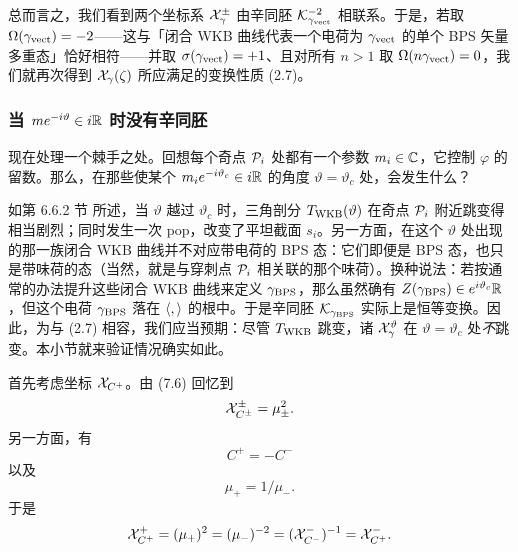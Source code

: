 总而言之，我们看到两个坐标系 $\mathcal{X}^\pm_\gamma$ 由辛同胚 $\mathcal{K}^{-2}_{\gamma_{\rm vect}}$ 相联系。于是，若取 $\Omega(\gamma_{\rm vect})=-2$——这与「闭合 WKB 曲线代表一个电荷为 $\gamma_{\rm vect}$ 的单个 BPS 矢量多重态」恰好相符——并取 $\sigma(\gamma_{\rm vect})=+1$、且对所有 $n>1$ 取 $\Omega(n\gamma_{\rm vect})=0$，我们就再次得到 $\mathcal{X}_\gamma(\zeta)$ 所应满足的变换性质 (2.7)。%

\subsubsection{当 $m e^{-i \vartheta} \in i \mathbb{R}$ 时没有辛同胚} \label{sec:no-flavor-jump}

现在处理一个棘手之处。回想每个奇点 $\mathcal{P}_i$ 处都有一个参数 $m_i\in\mathbb{C}$，它控制 $\varphi$ 的留数。那么，在那些使某个 $m_i e^{-i\vartheta_c}\in i\mathbb{R}$ 的角度 $\vartheta=\vartheta_c$ 处，会发生什么？

如第 6.6.2 节%
所述，当 $\vartheta$ 越过 $\vartheta_c$ 时，三角剖分 $T_{\rm WKB}(\vartheta)$ 在奇点 $\mathcal{P}_i$ 附近跳变得相当剧烈；同时发生一次 pop，改变了平坦截面 $s_i$。另一方面，在这个 $\vartheta$ 处出现的那一族闭合 WKB 曲线并不对应带电荷的 BPS 态：它们即便是 BPS 态，也只是带味荷的态（当然，就是与穿刺点 $\mathcal{P}_i$ 相关联的那个味荷）。换种说法：若按通常的办法提升这些闭合 WKB 曲线来定义 $\gamma_{\rm BPS}$，那么虽然确有 $Z(\gamma_{\rm BPS})\in e^{i\vartheta_c}\mathbb{R}$，但这个电荷 $\gamma_{\rm BPS}$ 落在 $\langle , \rangle$ 的根中。于是辛同胚 $\mathcal{K}_{\gamma_{\rm BPS}}$ 实际上是恒等变换。因此，为与 (2.7)%
相容，我们应当预期：尽管 $T_{\rm WKB}$ 跳变，诸 $\mathcal{X}^\vartheta_\gamma$ 在 $\vartheta=\vartheta_c$ 处\emph{不}跳变。本小节就来验证情况确实如此。

首先考虑坐标 $\mathcal{X}_{C^+}$。由 (7.6)%
回忆到
\begin{equation}
\mathcal{X}^\pm_{C^\pm} = \mu_\pm^{2}.
\end{equation}
另一方面，有
\begin{equation} \label{eq:ctrans}
C^+ = - C^-
\end{equation}
以及
\begin{equation}
\mu_+ = 1/\mu_-.
\end{equation}
于是
\begin{equation}
\mathcal{X}_{C^+}^+ = (\mu_+)^{2} = (\mu_-)^{-2} = (\mathcal{X}_{C^-}^-)^{-1} = \mathcal{X}_{C^+}^-.
\end{equation}


